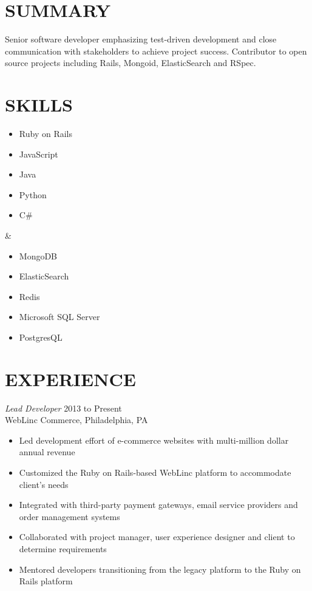 \documentclass[line]{res}
\begin{document}
\newsectionwidth{0in}

\address{michaelcdalton@gmail.com / (267) 247-2541}
\address{github.com/kcdragon}

\begin{resume}

\section{SUMMARY}
Senior software developer emphasizing test-driven development and close communication with stakeholders to achieve project success. Contributor to open source projects including Rails, Mongoid, ElasticSearch and RSpec.

\section{SKILLS}
\begin{ncolumn}{2}
\begin{itemize} \itemsep -2pt
\item Ruby on Rails
\item JavaScript
\item Java
\item Python
\item C\#
\end{itemize}
&
\begin{itemize} \itemsep -2pt
\item MongoDB
\item ElasticSearch
\item Redis
\item Microsoft SQL Server
\item PostgresQL
\end{itemize}
\end{ncolumn}

\section{EXPERIENCE}

{\sl Lead Developer} \hfill 2013 to Present \\
WebLinc Commerce, Philadelphia, PA
\begin{itemize} \itemsep -2pt
\item Led development effort of e-commerce websites with multi-million dollar annual revenue
\item Customized the Ruby on Rails-based WebLinc platform to accommodate client's needs
\item Integrated with third-party payment gateways, email service providers and order management systems
\item Collaborated with project manager, user experience designer and client to determine requirements
\item Mentored developers transitioning from the legacy platform to the Ruby on Rails platform
\end{itemize}


\end{resume}
\end{document}
